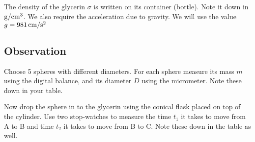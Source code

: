    The density of the glycerin $\sigma$ is written on its container (bottle). Note it down in $\gpss$. We also require the acceleration due to gravity. We will use the value $g = 981 \, \cmpss$

\subsection*{Observation}

   Choose 5 spheres with different diameters. For each sphere measure its mass $m$ using the digital balance, and its diameter $D$ using the micrometer. Note these down in your table.

   Now drop the sphere in to the glycerin using the conical flask placed on top of the cylinder. Use two stop-watches to measure the time $t_1$ it takes to move from A to B and time $t_2$ it takes to move from B to C. Note these down in the table as well.

